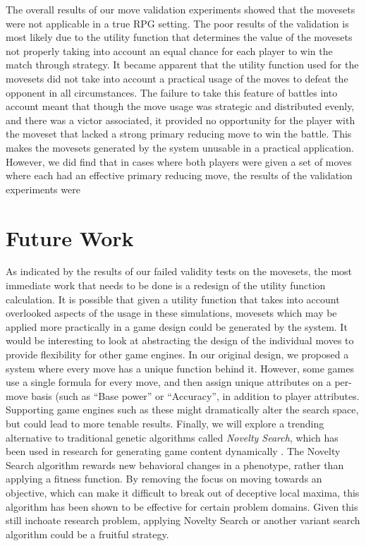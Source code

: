 \documentclass{acm_proc_article-sp}
\begin{document}
The overall results of our move validation experiments showed that the movesets were not applicable in a true RPG setting. The poor results of the validation is most likely due to the utility function that determines the value of the movesets not properly taking into account an equal chance for each player to win the match through strategy.  It became apparent that the utility function used for the movesets did not take into account a practical usage of the moves to defeat the opponent in all circumstances. The failure to take this feature of battles into account meant that though the move usage was strategic and distributed evenly, and there was a victor associated, it provided no opportunity for the player with the moveset that lacked a strong primary reducing move to win the battle. This makes the movesets generated by the system unusable in a practical application.
	However, we did find that in cases where both players were given a set of moves where each had an effective primary reducing move, the results of the validation experiments were 

    
    
    \section{Future Work}

As indicated by the results of our failed validity tests on the movesets, the most immediate work that needs to be done is a redesign of the utility function calculation. It is possible that given a utility function that takes into account overlooked aspects of the usage in these simulations, movesets which may be applied more practically in a game design could be generated by the system.
	It would be interesting to look at abstracting the design of the individual moves to provide flexibility for other game engines. In our original design, we proposed a system where every move has a unique function behind it. However, some games use a single formula for every move, and then assign unique attributes on a per-move basis (such as “Base power” or “Accuracy”, in addition to player attributes. Supporting game engines such as these might dramatically alter the search space, but could lead to more tenable results.
	Finally, we will explore a trending alternative to traditional genetic algorithms called \textit{Novelty Search}, which has been used in research for generating game content dynamically \cite {novelty_search}. The Novelty Search algorithm rewards new behavioral changes in a phenotype, rather than applying a fitness function. By removing the focus on moving towards an objective, which can make it difficult to break out of deceptive local maxima, this algorithm has been shown to be effective for certain problem domains. Given this still inchoate research problem, applying Novelty Search or another variant search algorithm could be a fruitful strategy.
    
\end{document}
